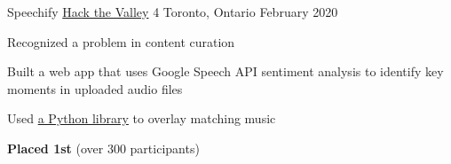 
\begin{cventries}

  \cventry
    {Speechify} %
    {\href{https://hackthevalley.io/}{Hack the Valley} 4} %
    {Toronto, Ontario} %
    {February 2020} %
    {
      \begin{cvitems} %
        \item{Recognized a problem in content curation}
        \item{Built a web app that uses Google Speech API sentiment analysis to identify key moments in uploaded audio files}
        \item{Used \href{https://pypi.org/project/pydub/}{a Python library} to overlay matching music}
        \item {\textbf{Placed 1st} (over 300 participants)}
      \end{cvitems}
    }


\end{cventries}
